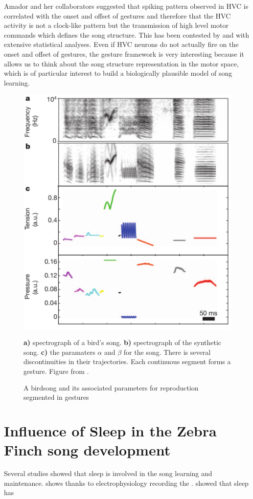 \documentclass{report}
\begin{document}
Amador and her collaborators suggested that spiking pattern observed
in HVC is correlated with the onset and offset of gestures and therefore that
the HVC activity is not a clock-like pattern but the transmission of high level
motor commands which defines the song structure. This has been contested by
\textcite{lynch_rhythmic_2016} and \textcite{picardo_population-level_2016} with
extensive statistical analyses. Even if HVC neurons do not actually fire on the
onset and offset of gestures, the gesture framework is very interesting because
it allows us to think about the song structure representation in the motor
space, which is of particular interest to build a biologically plausible model
of song learning.

\begin{figure}[htbp]
  {\center
  \includegraphics[width=0.5\linewidth]{media/gesture_schema_amador}
  \caption{A birdsong and its associated parameters for reproduction segmented
  in gestures\label{gestures_schema}}}

  \small
  \textbf{a)} spectrograph of a bird's song. \textbf{b)} spectrograph of the
  synthetic song. \textbf{c)} the paramaters \(\alpha\) and \(\beta\) for the
  song. There is several discontinuities in their trajectories. Each continuous
  segment forms a gesture. Figure from \textcite{amador_elemental_2013}.

\end{figure}

\section{Influence of Sleep in the Zebra Finch song development}
\label{influence-of-sleep-in-the-zebra-finch-song-development}

Several studies showed that sleep is involved in the song learning and
maintenance. \textcite{dave_song_2000} shows thanks to electrophysiology
recording the . \textcite{deregnaucourt_how_2005} showed that sleep has
\end{document}
